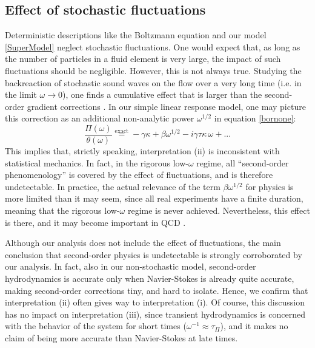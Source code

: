\documentclass[a4paper, amsfonts, amssymb, amsmath, reprint, showkeys, nofootinbib, twoside, onecolumn,notitlepage]{revtex4-2}
\begin{document}


\subsection{Effect of stochastic fluctuations}

Deterministic descriptions like the Boltzmann equation and our model \eqref{SuperModel} neglect stochastic fluctuations. One would expect that, as long as the number of particles in a fluid element is very large, the impact of such fluctuations should be negligible. However, this is not always true. Studying the backreaction of stochastic sound waves on the flow over a very long time (i.e. in the limit $\omega \rightarrow 0$), one finds a cumulative effect that is larger than the second-order gradient corrections \cite{KovtunStickiness2011}. In our simple linear response model, one may picture this correction as an additional non-analytic power $\omega^{1/2}$ in equation \eqref{bornone}:
\begin{equation}
    \dfrac{\Pi(\omega)}{\theta(\omega)} \overset{\text{exact}}{=} -\gamma \kappa+\beta \omega^{1/2} -i\gamma \tau \kappa \, \omega +...
\end{equation}
This implies that, strictly speaking, interpretation (ii) is inconsistent with statistical mechanics. In fact, in the rigorous low-$\omega$ regime, all ``second-order phenomenology'' is covered by the effect of fluctuations, and is therefore undetectable. In practice, the actual relevance of the term $\beta \omega^{1/2}$ for physics is more limited than it may seem, since all real experiments have a finite duration, meaning that the rigorous low-$\omega$ regime is never achieved. Nevertheless, this effect is there, and it may become important in QCD \cite{KovtunStickiness2011}.

Although our analysis does not include the effect of fluctuations, the main conclusion that second-order physics is undetectable is strongly corroborated by our analysis. In fact, also in our non-stochastic model, second-order hydrodynamics is accurate only when Navier-Stokes is already quite accurate, making second-order corrections tiny, and hard to isolate. Hence, we confirm that interpretation (ii) {often gives} way to interpretation (i). 
Of course, this discussion has no impact on interpretation (iii), since transient hydrodynamics is concerned with the behavior of the system for short times ($\omega^{-1} \approx \tau_\Pi$), and it makes no claim of being more accurate than Navier-Stokes at late times.
\end{document}
